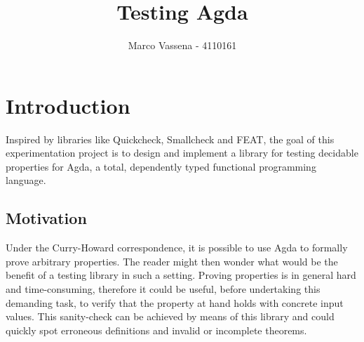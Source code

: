 \documentclass[10pt,a4paper]{article}
\author{Marco Vassena - 4110161}
\title{Testing Agda}
\begin{document}
\maketitle

\section{Introduction}
Inspired by libraries like Quickcheck, Smallcheck and FEAT, the goal of this experimentation project is to design and implement a library for testing decidable properties for Agda, a total, dependently typed functional programming language.

\subsection{Motivation}
Under the Curry-Howard correspondence, it is possible to use Agda to formally prove arbitrary properties. The reader might then wonder what would be the benefit of a testing library in such a setting. Proving properties is in general hard and time-consuming, therefore it could be useful, before undertaking this demanding task, to verify that the property at hand holds with concrete input values. This sanity-check can be achieved by means of this library and could quickly spot erroneous definitions and invalid or incomplete theorems.
\end{document}
